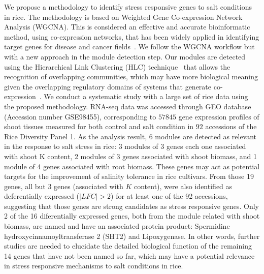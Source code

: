 \documentclass[journal, onecolumn]{IEEEtran}
\begin{document}
We propose a methodology to identify stress responsive genes to salt conditions in rice. The methodology is based on Weighted Gene Co-expression Network Analysis (WGCNA). This is considered an effective and accurate bioinformatic method, using co-expression networks, that has been widely applied in identifying target genes for disease and cancer fields~\cite{tian2018identifying}. We follow the WGCNA workflow but with a new approach in the module detection step. Our modules are detected using the Hierarchical Link Clustering (HLC) technique~\cite{ahn2010link} that allows the recognition of overlapping communities, which may have more biological meaning given the overlapping regulatory domains of systems that generate co-expression~\cite{gaiteri2014beyond}. We conduct a systematic study with a large set of rice data using the proposed methodology. RNA-seq data was accessed through GEO database~\cite{GEOAcces90:online} (Accession number GSE98455), corresponding to $57845$ gene expression profiles of shoot tissues measured for both control and salt condition in $92$ accessions of the Rice Diversity Panel 1. As the analysis result, 6 modules are detected as relevant in the response to salt stress in rice: 3 modules of 3 genes each one associated with shoot K content, 2 modules of 3 genes associated with  shoot biomass, and 1 module of 4 genes associated with root biomass. These genes may act as potential targets for the improvement of salinity tolerance in rice cultivars. From those 19 genes, all but 3 genes (associated with $K$ content), were also identified as deferentially expressed ($|LFC| > 2$) for at least one of the 92 accessions, suggesting that those genes are strong candidates as stress responsive genes. Only 2 of the 16 diferentially expressed genes, both from the module related with shoot biomass, are named and have an associated protein product: Spermidine hydroxycinnamoyltransferase 2 (SHT2) and Lipoxygenase. In other words, further studies are needed to elucidate the detailed biological function of the remaining 14 genes that have not been named so far,  which may have a potential relevance in stress responsive mechanisms to salt conditions in rice.\\
\end{document}
